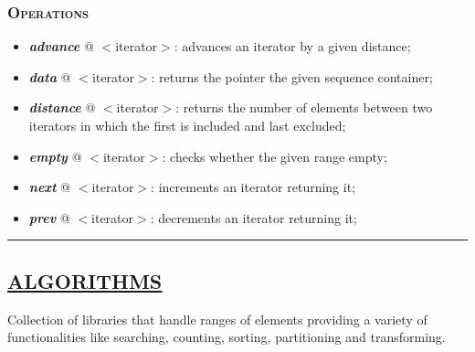 \documentclass[10pt]{article}
\begin{document}
\begin{multicols*}{5}
{\subsubsection*{\textsc{Operations}} 
\begin{itemize}[leftmargin=*,topsep=0.25pt]
  \setlength\itemsep{-1.8pt}
	\item  \emph{\textbf{advance}} @ $<$iterator$>$: advances an iterator by a given distance;
	\item  \emph{\textbf{data}} @ $<$iterator$>$: returns the pointer the given sequence container;
	\item  \emph{\textbf{distance}} @ $<$iterator$>$: returns the number of elements between two iterators in which the first is included and last excluded;
	\item  \emph{\textbf{empty}} @ $<$iterator$>$: checks whether the given range empty;
	\item  \emph{\textbf{next}} @ $<$iterator$>$: increments an iterator returning it;
	\item  \emph{\textbf{prev}} @ $<$iterator$>$: decrements an iterator returning it;
\end{itemize}
}

\par\noindent\rule{155pt}{0.4pt}

{\color{Blue}
\subsection*{\href{https://en.cppreference.com/w/cpp/algorithm}{\underline{ALGORITHMS}}}	
\noindent
Collection of libraries that handle ranges of elements providing a variety of functionalities like searching, counting, sorting, partitioning and transforming.

}
\end{multicols*}
\end{document}
